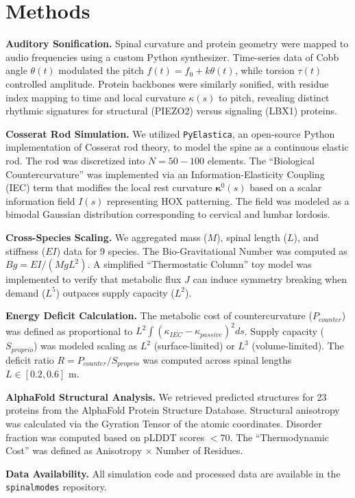 \documentclass[11pt]{article}
\begin{document}
\section*{Methods}

\textbf{Auditory Sonification.} Spinal curvature and protein geometry were mapped to audio frequencies using a custom Python synthesizer. Time-series data of Cobb angle $\theta(t)$ modulated the pitch $f(t) = f_0 + k \theta(t)$, while torsion $\tau(t)$ controlled amplitude. Protein backbones were similarly sonified, with residue index mapping to time and local curvature $\kappa(s)$ to pitch, revealing distinct rhythmic signatures for structural (PIEZO2) versus signaling (LBX1) proteins.

\textbf{Cosserat Rod Simulation.} We utilized \texttt{PyElastica}\cite{tekinalp2023}, an open-source Python implementation of Cosserat rod theory, to model the spine as a continuous elastic rod. The rod was discretized into $N=50-100$ elements. The ``Biological Countercurvature'' was implemented via an Information-Elasticity Coupling (IEC) term that modifies the local rest curvature $\bm{\kappa}^0(s)$ based on a scalar information field $I(s)$ representing HOX patterning. The field was modeled as a bimodal Gaussian distribution corresponding to cervical and lumbar lordosis.

\textbf{Cross-Species Scaling.} We aggregated mass ($M$), spinal length ($L$), and stiffness ($EI$) data for 9 species. The Bio-Gravitational Number was computed as $Bg = EI / (M g L^2)$. A simplified ``Thermostatic Column'' toy model was implemented to verify that metabolic flux $J$ can induce symmetry breaking when demand ($L^5$) outpaces supply capacity ($L^2$).

\textbf{Energy Deficit Calculation.} The metabolic cost of countercurvature ($P_{counter}$) was defined as proportional to $L^2 \int (\kappa_{IEC} - \kappa_{passive})^2 ds$. Supply capacity ($S_{proprio}$) was modeled scaling as $L^2$ (surface-limited) or $L^3$ (volume-limited). The deficit ratio $R = P_{counter} / S_{proprio}$ was computed across spinal lengths $L \in [0.2, 0.6]$ m.

\textbf{AlphaFold Structural Analysis.} We retrieved predicted structures for 23 proteins from the AlphaFold Protein Structure Database\cite{jumper2021}. Structural anisotropy was calculated via the Gyration Tensor of the atomic coordinates. Disorder fraction was computed based on pLDDT scores $< 70$. The ``Thermodynamic Cost'' was defined as Anisotropy $\times$ Number of Residues.

\textbf{Data Availability.} All simulation code and processed data are available in the \texttt{spinalmodes} repository.



\end{document}
